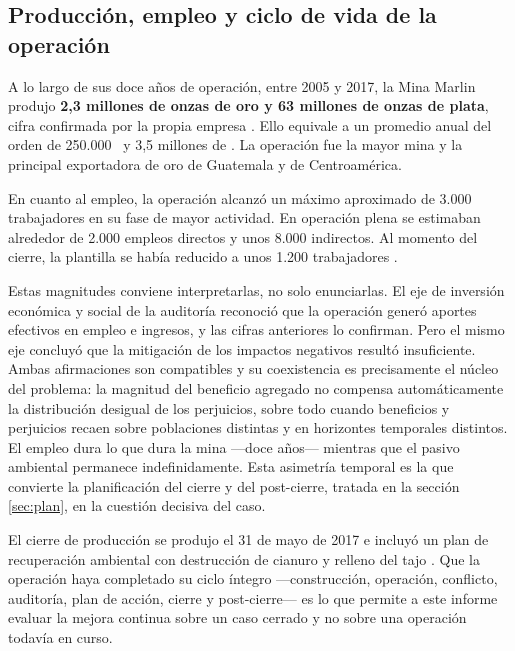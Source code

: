 \subsection{Producción, empleo y ciclo de vida de la operación}

A lo largo de sus doce años de operación, entre 2005 y 2017, la Mina Marlin
produjo \textbf{2,3 millones de onzas de oro y 63 millones de onzas de plata},
cifra confirmada por la propia empresa \parencite{goldcorp2017legacy}. Ello
equivale a un promedio anual del orden de 250.000 \ozAu\ y 3,5 millones de
\ozAg. La operación fue la mayor mina y la principal exportadora de oro de
Guatemala y de Centroamérica.

En cuanto al empleo, la operación alcanzó un máximo aproximado de 3.000
trabajadores en su fase de mayor actividad. En operación plena se estimaban
alrededor de 2.000 empleos directos y unos 8.000 indirectos. Al momento del
cierre, la plantilla se había reducido a unos 1.200 trabajadores
\parencite{oncommonground2010hria, prensalibre2017cierre}.

Estas magnitudes conviene interpretarlas, no solo enunciarlas. El eje de
inversión económica y social de la auditoría reconoció que la operación generó
aportes efectivos en empleo e ingresos, y las cifras anteriores lo confirman. Pero
el mismo eje concluyó que la mitigación de los impactos negativos resultó
insuficiente. Ambas afirmaciones son compatibles y su coexistencia es
precisamente el núcleo del problema: la magnitud del beneficio agregado no
compensa automáticamente la distribución desigual de los perjuicios, sobre todo
cuando beneficios y perjuicios recaen sobre poblaciones distintas y en horizontes
temporales distintos. El empleo dura lo que dura la mina —doce años— mientras que
el pasivo ambiental permanece indefinidamente. Esta asimetría temporal es la que
convierte la planificación del cierre y del post-cierre, tratada en la sección
\ref{sec:plan}, en la cuestión decisiva del caso.

El cierre de producción se produjo el 31 de mayo de 2017 e incluyó un plan de
recuperación ambiental con destrucción de cianuro y relleno del tajo
\parencite{goldcorp2023marlin}. Que la operación haya completado su ciclo
íntegro —construcción, operación, conflicto, auditoría, plan de acción, cierre y
post-cierre— es lo que permite a este informe evaluar la mejora continua sobre un
caso cerrado y no sobre una operación todavía en curso.

